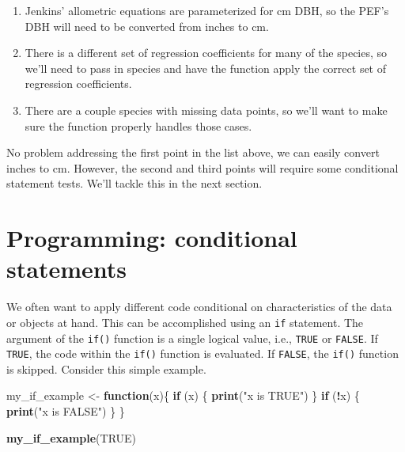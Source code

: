 \documentclass[
  11pt,
]{krantz}
\newenvironment{Shaded}{\begin{snugshade}}{\end{snugshade}}
\newcommand{\ControlFlowTok}[1]{\textcolor[rgb]{0.13,0.29,0.53}{\textbf{#1}}}
\newcommand{\KeywordTok}[1]{\textcolor[rgb]{0.13,0.29,0.53}{\textbf{#1}}}
\newcommand{\NormalTok}[1]{#1}
\newcommand{\OperatorTok}[1]{\textcolor[rgb]{0.81,0.36,0.00}{\textbf{#1}}}
\newcommand{\OtherTok}[1]{\textcolor[rgb]{0.56,0.35,0.01}{#1}}
\newcommand{\StringTok}[1]{\textcolor[rgb]{0.31,0.60,0.02}{#1}}
\providecommand{\tightlist}{%
  \setlength{\itemsep}{0pt}\setlength{\parskip}{0pt}}
\theoremstyle{definition}
\theoremstyle{definition}
\theoremstyle{definition}
\theoremstyle{definition}
\theoremstyle{remark}
\begin{document}
\begin{enumerate}
\def\labelenumi{\arabic{enumi}.}
\tightlist
\item
  Jenkins' allometric equations are parameterized for cm DBH, so the PEF's DBH will need to be converted from inches to cm.
\item
  There is a different set of regression coefficients for many of the species, so we'll need to pass in species and have the function apply the correct set of regression coefficients.
\item
  There are a couple species with missing data points, so we'll want to make sure the function properly handles those cases.
\end{enumerate}

No problem addressing the first point in the list above, we can easily convert inches to cm. However, the second and third points will require some conditional statement tests. We'll tackle this in the next section.

\hypertarget{programming-conditional-statements}{%
\section{Programming: conditional statements}\label{programming-conditional-statements}}

We often want to apply different code conditional on characteristics of the data or objects at hand. This can be accomplished using an \texttt{if} statement. The argument of the \texttt{if()} function is a single logical value, i.e., \texttt{TRUE} or \texttt{FALSE}. If \texttt{TRUE}, the code within the \texttt{if()} function is evaluated. If \texttt{FALSE}, the \texttt{if()} function is skipped. Consider this simple example.

\begin{Shaded}
\begin{Highlighting}[]
\NormalTok{my\_if\_example \textless{}{-}}\StringTok{ }\ControlFlowTok{function}\NormalTok{(x)\{}
  \ControlFlowTok{if}\NormalTok{ (x) \{}
    \KeywordTok{print}\NormalTok{(}\StringTok{"x is TRUE"}\NormalTok{)}
\NormalTok{  \}}
  \ControlFlowTok{if}\NormalTok{ (}\OperatorTok{!}\NormalTok{x) \{}
    \KeywordTok{print}\NormalTok{(}\StringTok{"x is FALSE"}\NormalTok{)}
\NormalTok{  \}}
\NormalTok{\}}

\KeywordTok{my\_if\_example}\NormalTok{(}\OtherTok{TRUE}\NormalTok{)}
\end{Highlighting}
\end{Shaded}
\end{document}
